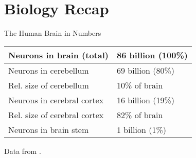 \section{Biology Recap}



\begin{frame}[c]{The Human Brain in Numbers}
    \pause
    \begin{tabular}{ll}
        Neurons in brain (total) & 86 billion (100\%) \\ \hline \pause
        Neurons in cerebellum & 69 billion (80\%) \\ \pause
        Rel. size of cerebellum & 10\% of brain \\ \hline \pause
        Neurons in cerebral cortex & 16 billion (19\%) \\ \pause
        Rel. size of cerebral cortex & 82\% of brain \\ \hline \pause
        Neurons in brain stem & 1 billion (1\%) \\
    \end{tabular}
    \newline
    \newline
    \newline
    Data from \cite{herculano2009human}.
\end{frame}


